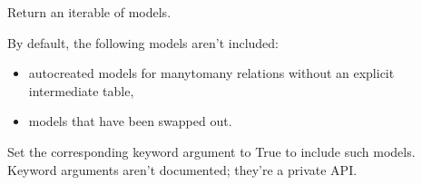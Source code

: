\documentclass[letterpaper,10pt,english]{sphinxmanual}
\begin{document}
\begin{fulllineitems}
\begin{fulllineitems}
\label{\detokenize{authenticate:authenticate.apps.AuthenticateConfig.get_models}}
\pysigstartsignatures
{}
\pysigstopsignatures
\sphinxAtStartPar
Return an iterable of models.

\sphinxAtStartPar
By default, the following models aren’t included:
\begin{itemize}
\item {} 
\sphinxAtStartPar
auto\sphinxhyphen{}created models for many\sphinxhyphen{}to\sphinxhyphen{}many relations without
an explicit intermediate table,

\item {} 
\sphinxAtStartPar
models that have been swapped out.

\end{itemize}

\sphinxAtStartPar
Set the corresponding keyword argument to True to include such models.
Keyword arguments aren’t documented; they’re a private API.

\end{fulllineitems}


\begin{fulllineitems}
\label{\detokenize{authenticate:authenticate.apps.AuthenticateConfig.import_models}}
\pysigstartsignatures
{}
\pysigstopsignatures
\end{fulllineitems}


\begin{fulllineitems}
\label{\detokenize{authenticate:authenticate.apps.AuthenticateConfig.name}}
\pysigstartsignatures
{}
\pysigstopsignatures
\end{fulllineitems}


\end{fulllineitems}
\end{document}
